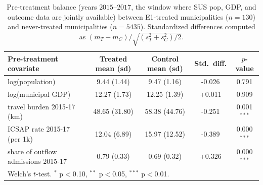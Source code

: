 \begin{table}[h!]
\centering
\caption{Pre-treatment balance (years $2015$--$2017$, the window where SUS pop, GDP, and outcome data are jointly available) between E1-treated municipalities ($n = 130$) and never-treated municipalities ($n = 5435$). Standardized differences computed as $(m_T - m_C) / \sqrt{(s_T^2 + s_C^2)/2}$.}
\label{tab:balance}
\small
\begin{tabular}{lcccc}
\toprule
Pre-treatment covariate & Treated mean (sd) & Control mean (sd) & Std.\ diff. & $p$-value \\
\midrule
log(population) & 9.44 (1.44) & 9.47 (1.16) & -0.026 & 0.791 \\
log(municipal GDP) & 12.27 (1.73) & 12.25 (1.39) & +0.011 & 0.909 \\
travel burden 2015-17 (km) & 48.65 (31.80) & 58.38 (44.76) & -0.251 & 0.001$^{***}$ \\
ICSAP rate 2015-17 (per 1k) & 12.04 (6.89) & 15.97 (12.52) & -0.389 & 0.000$^{***}$ \\
share of outflow admissions 2015-17 & 0.79 (0.33) & 0.69 (0.32) & +0.326 & 0.000$^{***}$ \\
\bottomrule
\multicolumn{5}{l}{\footnotesize Welch's $t$-test. $^{*}$ p$<$0.10, $^{**}$ p$<$0.05, $^{***}$ p$<$0.01.} \\
\end{tabular}
\end{table}